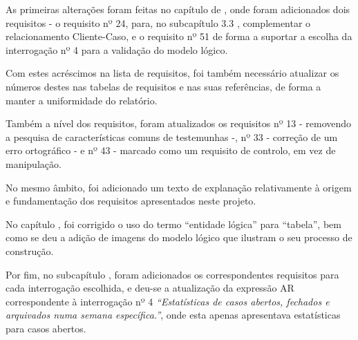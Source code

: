 \documentclass[a4paper,12pt]{scrreprt}
\begin{document}
    As primeiras alterações foram feitas no capítulo de \textit{}, onde foram adicionados dois requisitos - o requisito nº 24, para, no subcapítulo 3.3 \textit{}, complementar o relacionamento Cliente-Caso, e o requisito nº 51 de forma a suportar a escolha da interrogação nº 4 para a validação do modelo lógico.
    
    Com estes acréscimos na lista de requisitos, foi também necessário atualizar os números destes nas tabelas de requisitos e nas suas referências, de forma a manter a uniformidade do relatório.
    
    Também a nível dos requisitos, foram atualizados os requisitos nº 13 - removendo a pesquisa de características comuns de testemunhas -, nº 33 - correção de um erro ortográfico - e nº 43 - marcado como um requisito de controlo, em vez de manipulação.
    
     No mesmo âmbito, foi adicionado um texto de explanação relativamente à origem e fundamentação dos requisitos apresentados neste projeto.

    No capítulo \textit{}, foi corrigido o uso do termo “entidade lógica” para “tabela”, bem como se deu a adição de imagens do modelo lógico que ilustram o seu processo de construção.

    Por fim, no subcapítulo \textit{}, foram adicionados os correspondentes requisitos para cada interrogação escolhida, e deu-se a atualização da expressão AR
    correspondente à interrogação nº 4 \textit{“Estatísticas de casos abertos, fechados e arquivados numa semana específica.”}, onde esta apenas apresentava estatísticas para casos abertos.

\pagebreak



\renewcommand{\contentsname}{Índice}
\renewcommand{\listfigurename}{Índice de Figuras}
\renewcommand{\listtablename}{Índice de Tabelas}

\tableofcontents
\end{document}
